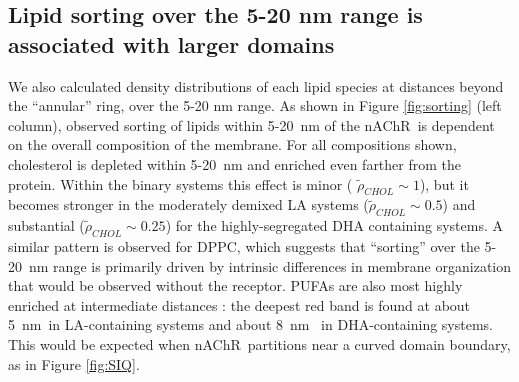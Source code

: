 \documentclass[final,3p,times,twocolumn]{elsarticle}
\newcommand{\nachr}{nAChR}
\begin{document}
	\subsection{Lipid sorting over the 5-20 nm range is associated with larger domains  } \label{Sorting}

	We also calculated density distributions of each lipid species at distances beyond the ``annular'' ring, over the 5-20 nm range.    As shown in Figure \ref{fig:sorting} (left column), observed sorting of lipids within {5-20~nm} of the \nachr~is dependent on the overall composition of the membrane. For all compositions shown, cholesterol is depleted within 5-20~nm and enriched even farther from the protein.  Within the binary systems this effect is minor ( $\tilde\rho_{CHOL} \sim 1$), but it becomes stronger in the moderately demixed LA systems ($\tilde\rho_{CHOL} \sim 0.5$) and substantial ($\tilde\rho_{CHOL} \sim 0.25$) for the highly-segregated DHA containing systems.  A similar pattern is observed for DPPC, which suggests that ``sorting'' over the 5-20~nm range is primarily driven by intrinsic differences in membrane organization that would be observed without the receptor. PUFAs are also most highly enriched at intermediate distances : the deepest red band is found at about 5~nm~in LA-containing systems and about 8~nm~ in DHA-containing systems.  This would be expected when \nachr~partitions near a curved domain boundary, as in Figure \ref{fig:SIQ}.      			
\end{document}
